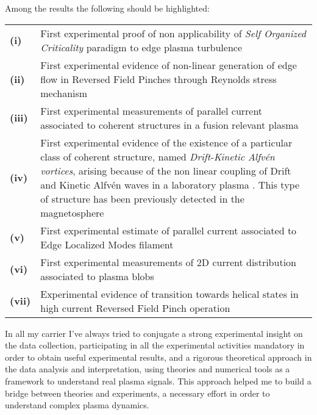 {Among the results the following should be highlighted:
\begin{longtable}{@{}>{\bfseries} p{} p{}@{}}
(i) &  First experimental proof of non applicability of \emph{Self
    Organized Criticality} paradigm to edge plasma
  turbulence \parencite{Spada:2001p3574,Antoni:2001p3221} \\
(ii) &  First experimental evidence of non-linear generation of edge
  flow in Reversed Field Pinches through Reynolds stress
  mechanism \parencite{Vianello:2005p1976,Vianello:2005p2671} \\
(iii) & First experimental measurements of parallel current associated
  to coherent structures in a fusion relevant plasma \parencite{Spolaore:2009p4115} \\
(iv) & First experimental evidence of the existence of a particular 
  class of coherent structure, named \emph{Drift-Kinetic Alfv\'en
    vortices}, arising because of the non linear coupling of Drift and
  Kinetic Alfv\'en waves in a laboratory plasma \parencite{Vianello:2010p4670}. This type of structure has been
  previously detected in the magnetosphere \\
(v) &  First experimental estimate of parallel current associated to
  Edge Localized Modes filament \parencite{PhysRevLett.106.125002} \\
(vi) & First experimental measurements of 2D current distribution
associated to plasma blobs \parencite{Furno:2011cs} \\
(vii) & Experimental evidence of transition towards helical states in
high current Reversed Field Pinch
operation \parencite{Lorenzini:2009p4248} \\
\end{longtable}

In all my carrier I've always tried to conjugate a strong experimental
insight on the data collection, participating in all the experimental
activities mandatory in order to obtain useful experimental results, and a rigorous theoretical approach in
the data analysis and interpretation, using theories and numerical
tools as a framework to understand real plasma signals. This
approach helped me to build a bridge between theories and experiments,
a necessary effort in order to understand complex plasma dynamics.
}
